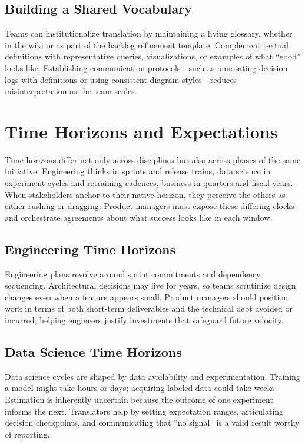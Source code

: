 \subsection{Building a Shared Vocabulary}
Teams can institutionalize translation by maintaining a living glossary, whether in the wiki or as part of the backlog refinement template. Complement textual definitions with representative queries, visualizations, or examples of what ``good'' looks like. Establishing communication protocols—such as annotating decision logs with definitions or using consistent diagram styles—reduces misinterpretation as the team scales.

\section{Time Horizons and Expectations}
\label{sec:time-horizons}

Time horizons differ not only across disciplines but also across phases of the same initiative. Engineering thinks in sprints and release trains, data science in experiment cycles and retraining cadences, business in quarters and fiscal years. When stakeholders anchor to their native horizon, they perceive the others as either rushing or dragging. Product managers must expose these differing clocks and orchestrate agreements about what success looks like in each window.

\subsection{Engineering Time Horizons}
Engineering plans revolve around sprint commitments and dependency sequencing. Architectural decisions may live for years, so teams scrutinize design changes even when a feature appears small. Product managers should position work in terms of both short-term deliverables and the technical debt avoided or incurred, helping engineers justify investments that safeguard future velocity.

\subsection{Data Science Time Horizons}
Data science cycles are shaped by data availability and experimentation. Training a model might take hours or days; acquiring labeled data could take weeks. Estimation is inherently uncertain because the outcome of one experiment informs the next. Translators help by setting expectation ranges, articulating decision checkpoints, and communicating that ``no signal'' is a valid result worthy of reporting.

